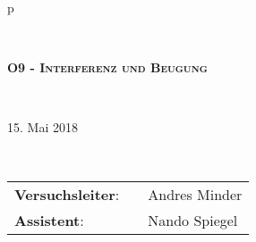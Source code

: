 \begin{tabular}{p{\textwidth}}

\begin{center}
\end{center}


\\

\begin{center}
\Huge{\textsc{
\textbf{O9 - Interferenz und Beugung} \\
}}
\end{center}

\\

\begin{center}
\LARGE{15. Mai 2018}
\end{center}

\\

\vspace*{15cm}


\hrulefill
\begin{flushleft}
\begin{tabular}{lll}
\LARGE \textbf{Versuchsleiter}: & 	\hspace{2cm} & \LARGE Andres Minder\\
\LARGE \textbf{Assistent}: 		& 	\hspace{2cm} & \LARGE Nando Spiegel\\
\end{tabular}
\end{flushleft}
\hrulefill
\end{tabular}
\newpage